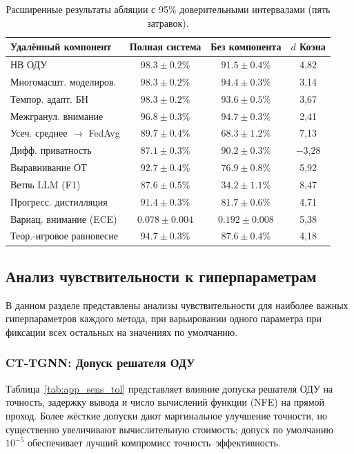 \begin{table}[htbp]
\centering
\caption{Расширенные результаты абляции с 95\% доверительными интервалами (пять затравок).}
\label{tab:app_ablation_ci}
\begin{tabular}{lccc}
\toprule
Удалённый компонент & Полная система & Без компонента & $d$ Коэна \\
\midrule
НВ ОДУ                   & $98.3{\pm}0.2$\% & $91.5{\pm}0.4$\% & 4,82 \\
Многомасшт. моделиров.    & $98.3{\pm}0.2$\% & $94.4{\pm}0.3$\% & 3,14 \\
Темпор. адапт. БН         & $98.3{\pm}0.2$\% & $93.6{\pm}0.5$\% & 3,67 \\
Межгранул. внимание       & $96.8{\pm}0.3$\% & $94.7{\pm}0.3$\% & 2,41 \\
Усеч. среднее $\to$ FedAvg & $89.7{\pm}0.4$\% & $68.3{\pm}1.2$\% & 7,13 \\
Дифф. приватность          & $87.1{\pm}0.3$\% & $90.2{\pm}0.3$\% & $-$3,28 \\
Выравнивание ОТ            & $92.7{\pm}0.4$\% & $76.9{\pm}0.8$\% & 5,92 \\
Ветвь LLM (F1)            & $87.6{\pm}0.5$\% & $34.2{\pm}1.1$\% & 8,47 \\
Прогресс. дистилляция      & $91.4{\pm}0.3$\% & $81.7{\pm}0.6$\% & 4,71 \\
Вариац. внимание (ECE)     & $0.078{\pm}0.004$ & $0.192{\pm}0.008$ & 5,38 \\
Теор.-игровое равновесие   & $94.7{\pm}0.3$\% & $87.6{\pm}0.4$\% & 4,18 \\
\bottomrule
\end{tabular}
\end{table}


\subsection{Анализ чувствительности к гиперпараметрам}
\label{app:sensitivity}

В данном разделе представлены анализы чувствительности для наиболее важных гиперпараметров каждого метода, при варьировании одного параметра при фиксации всех остальных на значениях по умолчанию.

\subsubsection{CT-TGNN: Допуск решателя ОДУ}

Таблица~\ref{tab:app_sens_tol} представляет влияние допуска решателя ОДУ на точность, задержку вывода и число вычислений функции (NFE) на прямой проход. Более жёсткие допуски дают маргинальное улучшение точности, но существенно увеличивают вычислительную стоимость; допуск по умолчанию $10^{-5}$ обеспечивает лучший компромисс точность--эффективность.

